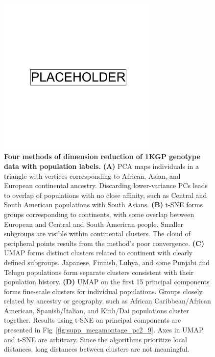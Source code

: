 \begin{figure}[ht]
    \centering
    \includegraphics[width=0.7\textwidth]{placeholder.png}
    \caption[Four methods of dimension reduction of 1KGP genotype data]{\textbf{Four methods of dimension reduction of 1KGP genotype data with population labels.} \textbf{(A)} PCA maps individuals in a triangle with vertices corresponding to African, Asian, and European continental ancestry. Discarding lower-variance PCs leads to overlap of populations with no close affinity, such as Central and South American populations with South Asians. \textbf{(B)} t-SNE forms groups corresponding to continents, with some overlap between European and Central and South American people. Smaller subgroups are visible within continental clusters. The cloud of peripheral points results from the method's poor convergence. \textbf{(C)} UMAP forms distinct clusters related to continent with clearly defined subgroups. Japanese, Finnish, Luhya, and some Punjabi and Telugu populations form separate clusters consistent with their population history\citep{10002015global}. \textbf{(D)} UMAP on the first 15 principal components forms fine-scale clusters for individual populations. Groups closely related by ancestry or geography, such as African Caribbean/African American, Spanish/Italian, and Kinh/Dai populations cluster together. Results using t-SNE on principal components are presented in Fig~\ref{fig:supp_megamontage_pc2_9}. Axes in UMAP and t-SNE are arbitrary. Since the algorithms prioritize local distances, long distances between clusters are not meaningful.}
    \label{fig:fig1}
\end{figure}

\clearpage

